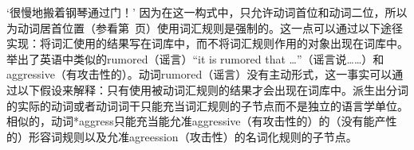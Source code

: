 \begin{exe}
\begin{xlist}[iv.]
\begin{exe}
\begin{xlist}[iv.]
\glt `很慢地搬着钢琴通过门！'
\z
\addlines
因为在这一构式中，只允许动词首位和动词二位，所以为动词居首位置（参看第~\pageref{lr-verb-movement}页）使用词汇规则是强制的。这一点可以通过以下途径实现：将词汇使用的结果写在词库中，而不将词汇规则作用的对象出现在词库中。\citet[\S~3.4.2, 5.3]{Koenig99a}举出了英语中类似的rumored（谣言）“it is rumored that \ldots”（谣言说……）和aggressive（有攻击性的）。动词rumored（谣言）没有主动形式，这一事实可以通过以下假设来解释：只有使用被动词汇规则的结果才会出现在词库中。派生出分词的实际的动词或者动词词干只能充当词汇规则的子节点而不是独立的语言学单位。相似的，动词*aggress只能充当能允准aggressive（有攻击性的）的（没有能产性的）形容词规则以及允准agreession（攻击性）的名词化规则的子节点。


\end{xlist}
\end{exe}
\end{xlist}
\end{exe}
